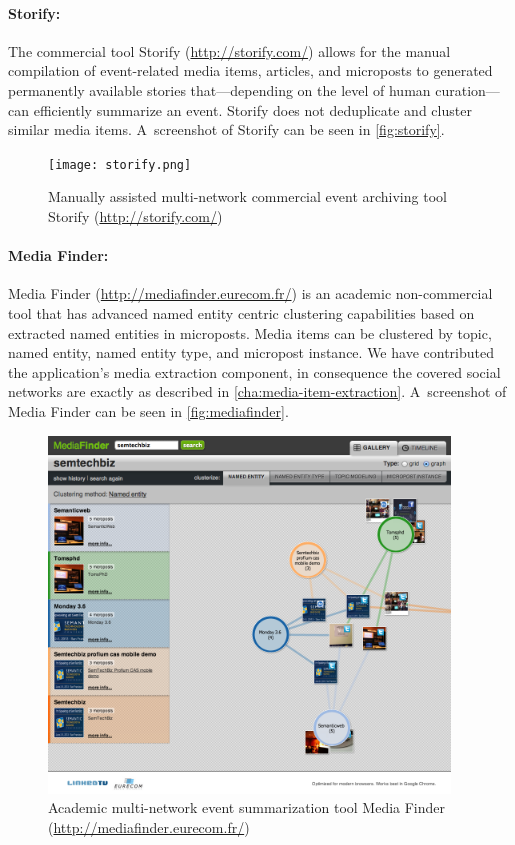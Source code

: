 \paragraph{Storify:}

The commercial tool Storify (\url{http://storify.com/})
allows for the manual compilation of
event-related media items, articles, and microposts
to generated permanently available stories
that---depending on the level of human curation---%
can efficiently summarize an event.
Storify does not deduplicate and cluster
similar media items.
A~screenshot of Storify can be seen in \autoref{fig:storify}.

\begin{figure}
  \centering
  \texttt{[image: storify.png]}
  \caption[Manually assisted commercial event archiving tool Storify]{Manually assisted multi-network commercial event archiving tool Storify
    (\url{http://storify.com/})}
  \label{fig:storify}
\end{figure}

\paragraph{Media Finder:}

Media Finder (\url{http://mediafinder.eurecom.fr/})
is an academic non-commercial tool that
has advanced named entity centric clustering capabilities
based on extracted named entities in microposts.
Media items can be clustered by topic, named entity,
named entity type, and micropost instance.
We have contributed the application's media extraction component,
in consequence the covered social networks
are exactly as described in \autoref{cha:media-item-extraction}.
A~screenshot of Media Finder can be seen in \autoref{fig:mediafinder}.

\begin{figure}
  \centering
  \includegraphics[width=0.95\textwidth,height=0.9\textheight,keepaspectratio]{mediafinder.png}
  \caption[Academic event summarization tool Media Finder]{Academic multi-network event summarization tool Media Finder (\url{http://mediafinder.eurecom.fr/})}
  \label{fig:mediafinder}
\end{figure}

